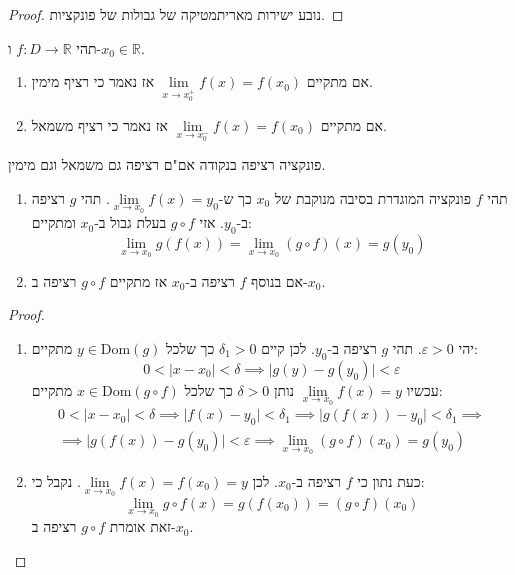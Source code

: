 \documentclass{tstextbook}
\begin{document}
\begin{proof}
נובע ישירות מאריתמטיקה של גבולות של פונקציות.

\end{proof}
\begin{definition}
תהי \(f:D\to \mathbb{R}\) ו-\(x_{0} \in \mathbb{R}\).

  \begin{enumerate}
    \item אם מתקיים \(\underset{ x \to x_{0}^{+} }{\lim }f(x)=f(x_{0})\) אז נאמר כי רציף מימין. 


    \item אם מתקיים \(\underset{ x \to x_{0}^{-} }{\lim }f(x)=f(x_{0})\) אז נאמר כי רציף משמאל. 


  \end{enumerate}
\end{definition}
\begin{proposition}
פונקציה רציפה בנקודה אם"ם רציפה גם משמאל וגם מימין.

\end{proposition}
\begin{theorem}
  \begin{enumerate}
    \item תהי \(f\) פונקציה המוגדרת בסיבה מנוקבת של \(x_{0}\) כך ש-\(\underset{ x \to x_{0} }{\lim }f(x)=y_{0}\). תהי \(g\) רציפה ב-\(y_{0}\). אזי \(g\circ f\) בעלת גבול ב-\(x_{0}\) ומתקיים: 
$$\lim_{ x \to x_{0} } g(f(x))=\lim_{ x \to x_{0} } \left( g \circ  f \right)(x)=g(y_{0})$$


    \item אם בנוסף \(f\)  רציפה ב-\(x_{0}\) אז מתקיים \(g \circ f\) רציפה ב-\(x_{0}\). 


  \end{enumerate}
\end{theorem}
\begin{proof}
  \begin{enumerate}
    \item יהי \(\varepsilon>0\). תהי \(g\) רציפה ב-\(y_{0}\). לכן קיים \(\delta_{1}>0\) כך שלכל \(y \in \mathrm{Dom}(g)\) מתקיים: 
$$0<\lvert x-x_{0} \rvert <\delta\implies \lvert g(y)-g(y_{0}) \rvert <\varepsilon$$
עכשיו \(\underset{ x \to x_{0} }{\lim }f(x)=y\) נותן \(\delta>0\) כך שלכל \(x \in \mathrm{Dom}\left( g \circ f \right)\) מתקיים:
$$\begin{gather}0<\lvert x-x_{0} \rvert <\delta\implies \lvert f(x)-y_{0} \rvert <\delta_{1}\implies \lvert g(f(x))-y_{0} \rvert <\delta_{1} \implies \\\implies \lvert g(f(x))-g(y_{0}) \rvert <\varepsilon \implies \lim_{ x \to x_{0} } \left( g\circ f \right)(x_{0})=g(y_{0})
\end{gather}$$


    \item כעת נתון כי \(f\) רציפה ב-\(x_{0}\). לכן \(\underset{ x \to x_{0} }{\lim }f(x)=f(x_{0})=y\). נקבל כי: 
$$\lim_{ x \to x_{0} } g \circ f(x)=g(f(x_{0}))=\left( g\circ f \right)(x_{0})$$
זאת אומרת \(g\circ f\) רציפה ב-\(x_{0}\).


  \end{enumerate}
\end{proof}
\end{document}
